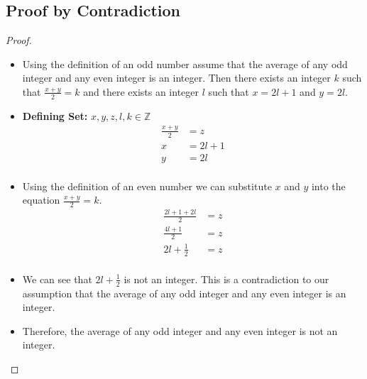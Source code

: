 \documentclass{article}
\begin{document}
\subsection*{Proof by Contradiction}
\begin{proof}
        
        \begin{itemize}
            \item[]Using the definition of an odd number assume that the average of any odd integer and any even integer is an integer. Then there exists an integer $k$ such that $\frac{x + y}{2} = k$ and there exists an integer $l$ such that $x = 2l + 1$ and $y = 2l$.
            \item[] \textbf{Defining Set: }$x, y, z, l, k \in \mathbb{Z}$
            \begin{align*}
            \frac{x + y}{2} &= z \\
            x &= 2l + 1 \\
            y &= 2l \\
            \end{align*}
            \item[] Using the definition of an even number we can substitute $x$ and $y$ into the equation $\frac{x + y}{2} = k$.
            \begin{align*}
            \frac{2l + 1 + 2l}{2} &= z \\
            \frac{4l + 1}{2} &= z \\
            2l + \frac{1}{2} &= z \\
            \end{align*}
            \item[] We can see that $2l + \frac{1}{2}$ is not an integer. This is a contradiction to our assumption that the average of any odd integer and any even integer is an integer. 
            \item[] Therefore, the average of any odd integer and any even integer is not an integer.
            \end{itemize}
\end{proof}
\end{document}
